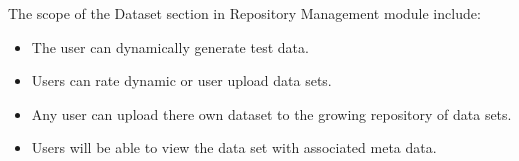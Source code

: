 The scope of the Dataset section in Repository Management module include:
\begin{itemize}
  \item The user can dynamically generate test data.
  \item Users can rate dynamic or user upload data sets.
  \item Any user can upload there own dataset to the growing repository of data sets.
  \item Users will be able to view the data set with associated meta data.
\end{itemize}





